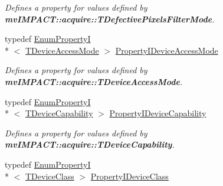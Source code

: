 \begin{DoxyCompactItemize}
\begin{DoxyCompactList}\small\item\em Defines a property for values defined by {\bfseries mv\+I\+M\+P\+A\+C\+T\+::acquire\+::\+T\+Defective\+Pixels\+Filter\+Mode}. \end{DoxyCompactList}\item 
\hypertarget{group___common_interface_gac860ed08eaeb7ccb3cbc879a22ca43c9}{typedef \hyperlink{classmv_i_m_p_a_c_t_1_1acquire_1_1_enum_property_i}{Enum\+Property\+I}\\*
$<$ \hyperlink{group___common_interface_ga9b3c160c06d68e5840aba2e4685389b8}{T\+Device\+Access\+Mode} $>$ \hyperlink{group___common_interface_gac860ed08eaeb7ccb3cbc879a22ca43c9}{Property\+I\+Device\+Access\+Mode}}\label{group___common_interface_gac860ed08eaeb7ccb3cbc879a22ca43c9}

\begin{DoxyCompactList}\small\item\em Defines a property for values defined by {\bfseries mv\+I\+M\+P\+A\+C\+T\+::acquire\+::\+T\+Device\+Access\+Mode}. \end{DoxyCompactList}\item 
\hypertarget{group___common_interface_ga4a143abc5e951b2d4a22a0a835d4c5d1}{typedef \hyperlink{classmv_i_m_p_a_c_t_1_1acquire_1_1_enum_property_i}{Enum\+Property\+I}\\*
$<$ \hyperlink{group___common_interface_gab025951bf5eb52c67790e7ecd197b76e}{T\+Device\+Capability} $>$ \hyperlink{group___common_interface_ga4a143abc5e951b2d4a22a0a835d4c5d1}{Property\+I\+Device\+Capability}}\label{group___common_interface_ga4a143abc5e951b2d4a22a0a835d4c5d1}

\begin{DoxyCompactList}\small\item\em Defines a property for values defined by {\bfseries mv\+I\+M\+P\+A\+C\+T\+::acquire\+::\+T\+Device\+Capability}. \end{DoxyCompactList}\item 
\hypertarget{group___common_interface_gaa711dff24b159d7f25686f736db21a2f}{typedef \hyperlink{classmv_i_m_p_a_c_t_1_1acquire_1_1_enum_property_i}{Enum\+Property\+I}\\*
$<$ \hyperlink{group___common_interface_ga9f8cbab52f6b995214e7ac4bc56bc11a}{T\+Device\+Class} $>$ \hyperlink{group___common_interface_gaa711dff24b159d7f25686f736db21a2f}{Property\+I\+Device\+Class}}\label{group___common_interface_gaa711dff24b159d7f25686f736db21a2f}


\end{DoxyCompactItemize}
